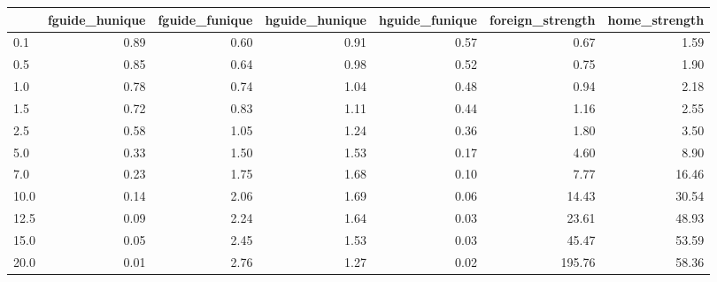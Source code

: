 \begin{tabular}{lrrrrrr}
\toprule
 & fguide_hunique & fguide_funique & hguide_hunique & hguide_funique & foreign_strength & home_strength \\
\midrule
0.1 & 0.89 & 0.60 & 0.91 & 0.57 & 0.67 & 1.59 \\
0.5 & 0.85 & 0.64 & 0.98 & 0.52 & 0.75 & 1.90 \\
1.0 & 0.78 & 0.74 & 1.04 & 0.48 & 0.94 & 2.18 \\
1.5 & 0.72 & 0.83 & 1.11 & 0.44 & 1.16 & 2.55 \\
2.5 & 0.58 & 1.05 & 1.24 & 0.36 & 1.80 & 3.50 \\
5.0 & 0.33 & 1.50 & 1.53 & 0.17 & 4.60 & 8.90 \\
7.0 & 0.23 & 1.75 & 1.68 & 0.10 & 7.77 & 16.46 \\
10.0 & 0.14 & 2.06 & 1.69 & 0.06 & 14.43 & 30.54 \\
12.5 & 0.09 & 2.24 & 1.64 & 0.03 & 23.61 & 48.93 \\
15.0 & 0.05 & 2.45 & 1.53 & 0.03 & 45.47 & 53.59 \\
20.0 & 0.01 & 2.76 & 1.27 & 0.02 & 195.76 & 58.36 \\
\bottomrule
\end{tabular}
